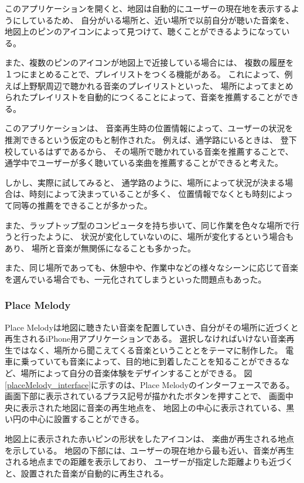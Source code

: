 \documentclass[a4paper, 11pt, onecolumn, report]{jsarticle}
\begin{document}
このアプリケーションを開くと、地図は自動的にユーザーの現在地を表示するようにしているため、
自分がいる場所と、近い場所で以前自分が聴いた音楽を、
地図上のピンのアイコンによって見つけて、聴くことができるようになっている。

また、複数のピンのアイコンが地図上で近接している場合には、
複数の履歴を１つにまとめることで、プレイリストをつくる機能がある。
これによって、例えば上野駅周辺で聴かれる音楽のプレイリストといった、
場所によってまとめられたプレイリストを自動的につくることによって、音楽を推薦することができる。

このアプリケーションは、
音楽再生時の位置情報によって、ユーザーの状況を推測できるという仮定のもと制作された。
例えば、通学路にいるときは、
登下校しているはずであるから、
その場所で聴かれている音楽を推薦することで、
通学中でユーザーが多く聴いている楽曲を推薦することができると考えた。

しかし、実際に試してみると、
通学路のように、場所によって状況が決まる場合は、時刻によって決まっていることが多く、
位置情報でなくとも時刻によって同等の推薦をできることが多かった。

また、ラップトップ型のコンピュータを持ち歩いて、同じ作業を色々な場所で行うと行ったように、
状況が変化していないのに、場所が変化するという場合もあり、
場所と音楽が無関係になることも多かった。

また、同じ場所であっても、休憩中や、作業中などの様々なシーンに応じて音楽を選んでいる場合でも、一元化されてしまうといった問題点もあった。

\subsubsection{Place Melody}
Place Melodyは地図に聴きたい音楽を配置していき、自分がその場所に近づくと再生されるiPhone用アプリケーションである。
選択しなければいけない音楽再生ではなく、場所から聞こえてくる音楽ということとをテーマに制作した。
電車に乗っていても音楽によって、目的地に到着したことを知ることができるなど、場所によって自分の音楽体験をデザインすることができる。
図\ref{placeMelody_interface}に示すのは、Place Melodyのインターフェースである。
画面下部に表示されているプラス記号が描かれたボタンを押すことで、
画面中央に表示された地図に音楽の再生地点を、
地図上の中心に表示されている、黒い円の中心に設置することができる。

地図上に表示された赤いピンの形状をしたアイコンは、
楽曲が再生される地点を示している。
地図の下部には、ユーザーの現在地から最も近い、音楽が再生される地点までの距離を表示しており、
ユーザーが指定した距離よりも近づくと、設置された音楽が自動的に再生される。
\end{document}
